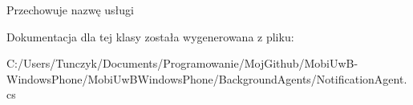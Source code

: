 Przechowuje nazwę usługi 



Dokumentacja dla tej klasy została wygenerowana z pliku\+:\begin{DoxyCompactItemize}
\item 
C\+:/\+Users/\+Tunczyk/\+Documents/\+Programowanie/\+Moj\+Github/\+Mobi\+Uw\+B-\/\+Windows\+Phone/\+Mobi\+Uw\+B\+Windows\+Phone/\+Background\+Agents/Notification\+Agent.\+cs\end{DoxyCompactItemize}
